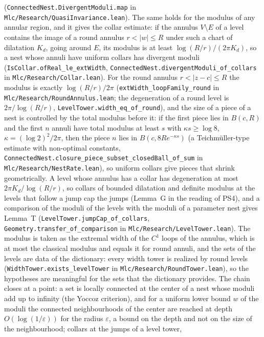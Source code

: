 \documentclass[11pt,a4paper]{article}
\begin{document}
(\texttt{ConnectedNest.DivergentModuli.map} in \texttt{Mlc/Research/QuasiInvariance.lean}). The
same holds for the modulus of any annular region, and it gives the collar estimate: if the
annulus \(V\setminus E\) of a level contains the image of a round annulus \(r<|w|\le R\) under
such a chart of dilatation \(K_d\), going around \(E\), its modulus is at least
\(\log(R/r)/(2\pi K_d)\), so a nest whose annuli have uniform collars has divergent moduli
(\texttt{IsCollar.ofReal\_le\_extWidth}, \texttt{ConnectedNest.divergentModuli\_of\_collars} in
\texttt{Mlc/Research/Collar.lean}). For the round annulus \(r<|z-c|\le R\) the modulus is exactly
\(\log(R/r)/2\pi\) (\texttt{extWidth\_loopFamily\_round} in \texttt{Mlc/Research/RoundAnnulus.lean}; the degeneration of
a round level is \(2\pi/\log(R/r)\), \texttt{LevelTower.width\_eq\_of\_round}),
and the size of a piece of a nest is controlled by the total modulus before it: if the first piece
lies in \(B(c,R)\) and the first \(n\) annuli have total modulus at least \(s\) with
\(\kappa s\ge\log 8\), \(\kappa=(\log 2)^2/2\pi\), then the piece \(n\) lies in
\(B(c,8Re^{-\kappa s})\) (a Teichm\"uller-type estimate with non-optimal constants,
\texttt{ConnectedNest.closure\_piece\_subset\_closedBall\_of\_sum} in
\texttt{Mlc/Research/NestRate.lean}), so uniform collars give pieces that shrink geometrically.
A level whose annulus has a collar has degeneration at most
\(2\pi K_d/\log(R/r)\), so collars of bounded dilatation and definite modulus at the levels that
follow a jump cap the jumps (Lemma~G in the reading of PS4), and a comparison of the moduli of
the levels with the moduli of a parameter nest gives Lemma~T
(\texttt{LevelTower.jumpCap\_of\_collars}, \texttt{Geometry.transfer\_of\_comparison} in
\texttt{Mlc/Research/LevelTower.lean}). The modulus is taken as the extremal width of the \(C^1\)
loops of the annulus, which is at most the classical modulus and equals it for round annuli, and
the sets of the levels are data of the dictionary: every width tower is realized by round levels
(\texttt{WidthTower.exists\_levelTower} in \texttt{Mlc/Research/RoundTower.lean}), so the
hypotheses are meaningful for the sets that the dictionary provides. The chain closes at a point: a set is locally connected at
the center of a nest whose moduli add up to infinity (the Yoccoz criterion), and for a uniform
lower bound \(w\) of the moduli the connected neighbourhoods of the center are reached at depth
\(O(\log(1/\varepsilon))\) for the radius \(\varepsilon\), a bound on the depth and not on the size of
the neighbourhood; collars at the jumps of a level tower,
\end{document}
